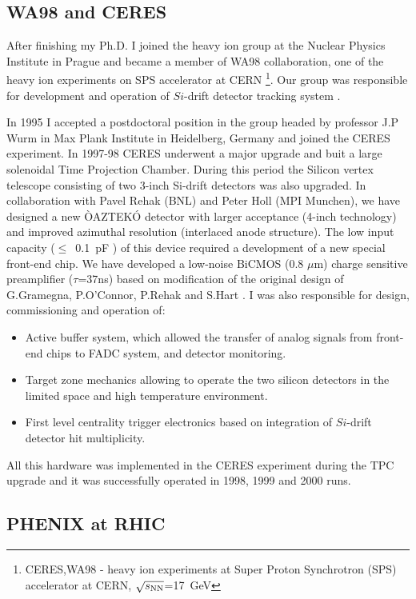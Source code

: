 \documentclass[12pt]{article}
\begin{document}
\subsection{WA98 and CERES}

After finishing my Ph.D. I joined the heavy ion group at the Nuclear Physics Institute in Prague and became a member of WA98 collaboration, one of the heavy ion experiments on SPS accelerator at CERN
\footnote{CERES,WA98 - heavy ion experiments at Super Proton Synchrotron (SPS) accelerator at CERN, $\sqrt{s_{\rm NN}}$=17~GeV}. Our group was responsible for development and operation of  $Si$-drift detector tracking system \cite{Gatti:1984uu}. 

In 1995 I accepted a postdoctoral position in the group headed by professor J.P Wurm in Max Plank Institute in Heidelberg, Germany and joined the CERES experiment. In 1997-98  CERES  underwent a major upgrade and buit a large solenoidal Time Projection Chamber. During this period the Silicon vertex telescope consisting of two 3-inch Si-drift detectors was also upgraded. In collaboration with Pavel Rehak (BNL) and Peter Holl (MPI Munchen), we have designed a new ÒAZTEKÓ detector with larger acceptance (4-inch technology) and improved azimuthal resolution (interlaced anode structure).  The low input capacity ($\leq$~0.1~pF ) of this device required a development of  a new special front-end chip. We have developed a low-noise BiCMOS (0.8 $\mu$m) charge sensitive preamplifier ($\tau$=37ns) based on modification of the original design of  G.Gramegna, P.O'Connor, P.Rehak and S.Hart \cite{O'Connor:1998xv}.  I was also responsible for design, commissioning and operation of: 
\begin{itemize}
\item Active buffer system, which allowed the transfer of  analog signals from front-end chips to FADC system, and detector monitoring.   
\item Target zone mechanics allowing to operate the two silicon detectors in the limited space and high temperature environment.
\item First level centrality trigger electronics based on integration of $Si$-drift detector hit multiplicity.
\end{itemize}
All this hardware was implemented in the CERES experiment during the TPC upgrade and it was successfully operated in  1998, 1999 and 2000 runs.


\subsection{PHENIX at RHIC}
\end{document}
